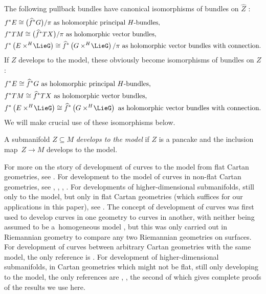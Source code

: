\documentclass[11pt]{article}
\numberwithin{equation}{section}
\numberwithin{equation}{section}
\newcommand{\amal}[3]{\ensuremath{{#1} \mathbin{\times^{#2}} \! #3}}
\begin{document}
The following pullback bundles have canonical isomorphisms of bundles on $\hat{Z}$ \cite[Section~2.3]{Biswas.McKay:2016}:
\begin{gather*}
\begin{split}
&f^* E \cong \big(\widehat{f}^* G\big)/\pi \text{ as holomorphic principal $H$-bundles}, \\
&f^* TM \cong \big(\widehat{f}^* TX\big)/\pi \text{ as holomorphic vector bundles}, \\
&f^* \pr{\amal{E}{H}{\LieG}} \cong \widehat{f}^* \pr{\amal{G}{H}{\LieG}}/\pi \text{ as holomorphic vector bundles with connection}.
\end{split}
\end{gather*}
If $Z$ develops to the model, these obviously become isomorphisms of bundles on $Z$:
\begin{gather*}
\begin{split}
&f^* E \cong \widehat{f}^* G \text{ as holomorphic principal $H$-bundles}, \\
&f^* TM \cong \widehat{f}^* TX \text{ as holomorphic vector bundles}, \\
&f^* \pr{\amal{E}{H}{\LieG}} \cong \widehat{f}^* \pr{\amal{G}{H}{\LieG}} \text{ as holomorphic vector bundles with connection}.
\end{split}
\end{gather*}
We will make crucial use of these isomorphisms below.

A submanifold $Z\subseteq M$ \emph{develops to the model} if $Z$ is a pancake and the inclusion map~${Z\!\to\! M}$ develops to the model.

For more on the story of development of curves to the model from flat Cartan geometries, see \cite[p.~3]{Goldman:2010}. For development to the model of curves in non-flat Cartan geometries, see
\cite[p.~108, 1.5.17]{Cap/Slovak:2009}, \cite[p.~54, 41X]{Cartan1935}, \cite{Ehresmann:1951}, \cite[p.~368]{Sharpe:1997}. For developments of higher-dimensional submanifolds, still only to the model, but only
in flat Cartan geometries (which suffices for our applications in this paper), see
\cite[Section~4]{KobayashiOchiai:1980}. The concept of development of curves was first used to develop
curves in one geometry to curves in another, with neither being assumed to be a~homogeneous model
\cite{Rinow1932}, but this was only carried out in Riemannian geometry to compare any two Riemannian
geometries on surfaces. For development of curves between arbitrary Cartan geometries with the same model,
the only reference is \cite[Section~17]{mckay2023introduction}. For development of higher-dimensional
submanifolds, in Cartan geometries which might not be flat, still only developing to the model, the only
references are \cite[Section~2.3]{Biswas.McKay:2016}, \cite[p.~43]{mckay2023introduction}, the second of
which gives complete proofs of the results we use here.
\end{document}
